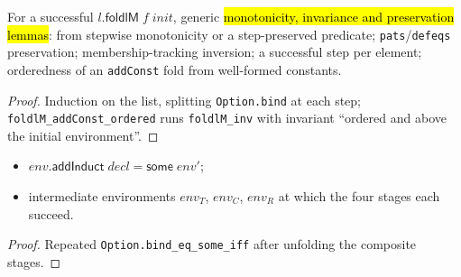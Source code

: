 \begin{lemma}
\label{family:indlem-foldlm}
\leanok
{} 

 For a successful $l.\mathsf{foldlM}\;f\;init$, generic \hl{monotonicity,
invariance and preservation lemmas}: from stepwise monotonicity or a step-preserved
predicate; \texttt{pats}/\texttt{defeqs} preservation; membership-tracking inversion; a
successful step per element; orderedness of an \texttt{addConst} fold from well-formed
constants.
\end{lemma}
\begin{proof}
\leanok
{} Induction on the list, splitting \texttt{Option.bind} at each step;
\texttt{foldlM\_addConst\_ordered} runs \texttt{foldlM\_inv} with invariant ``ordered and
above the initial environment''.
\end{proof}

\begin{theorem}
\label{thm:indlem-add-induct-stages}
\leanok
{} 
\begin{itemize}
\item {} $env.\mathsf{addInduct}\;decl = \mathsf{some}\;env'$;
\item {} intermediate environments $env_T$, $env_C$, $env_R$ at which the four
stages each succeed.
\end{itemize}
\end{theorem}
\begin{proof}
\leanok
{} Repeated \texttt{Option.bind\_eq\_some\_iff} after unfolding the composite
stages.
\end{proof}

